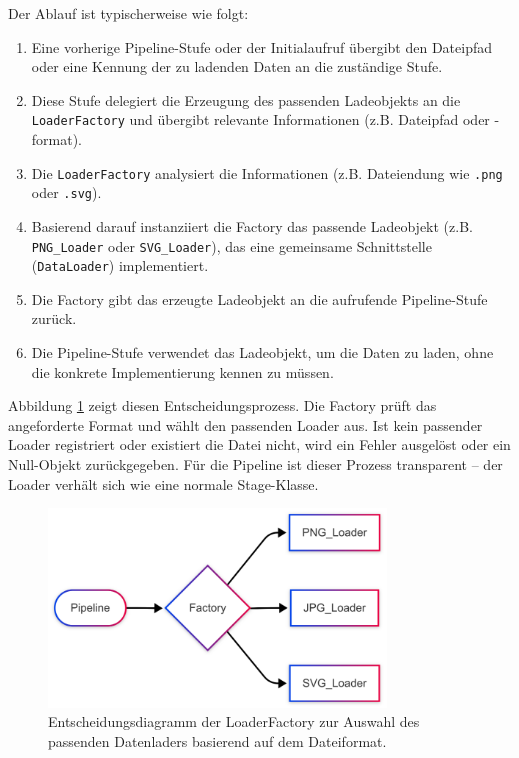\documentclass[10pt,a4paper]{article}
\begin{document}
Der Ablauf ist typischerweise wie folgt:
\begin{enumerate}
    \item Eine vorherige Pipeline-Stufe oder der Initialaufruf übergibt den Dateipfad oder eine Kennung der zu ladenden Daten an die zuständige Stufe.
    \item Diese Stufe delegiert die Erzeugung des passenden Ladeobjekts an die \texttt{LoaderFactory} und übergibt relevante Informationen (z.B. Dateipfad oder -format).
    \item Die \texttt{LoaderFactory} analysiert die Informationen (z.B. Dateiendung wie \texttt{.png} oder \texttt{.svg}).
    \item Basierend darauf instanziiert die Factory das passende Ladeobjekt (z.B. \texttt{PNG\_Loader} oder \texttt{SVG\_Loader}), das eine gemeinsame Schnittstelle (\texttt{DataLoader}) implementiert.
    \item Die Factory gibt das erzeugte Ladeobjekt an die aufrufende Pipeline-Stufe zurück.
    \item Die Pipeline-Stufe verwendet das Ladeobjekt, um die Daten zu laden, ohne die konkrete Implementierung kennen zu müssen.
\end{enumerate}

Abbildung \ref{fig:loaderFactory} zeigt diesen Entscheidungsprozess. Die Factory prüft das angeforderte Format und wählt den passenden Loader aus. Ist kein passender Loader registriert oder existiert die Datei nicht, wird ein Fehler ausgelöst oder ein Null-Objekt zurückgegeben. Für die Pipeline ist dieser Prozess transparent – der Loader verhält sich wie eine normale Stage-Klasse.

\begin{figure}[htbp]
    \centering
    \includegraphics[width=0.8\textwidth]{img/PipelineFactory.png}
    \caption{Entscheidungsdiagramm der LoaderFactory zur Auswahl des passenden Datenladers basierend auf dem Dateiformat.}
    \label{fig:loaderFactory}
\end{figure}
\end{document}
